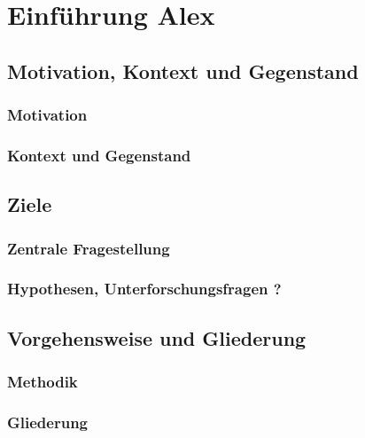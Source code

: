 \documentclass[a4paper, 11pt]{article}
\begin{document}
    \pagestyle{empty}
    
    \newpage
    \hypertarget{contents}{}
    \tableofcontents

    \newpage
    \pagestyle{fancy}
    \section{Einführung \small{Alex}}\label{sec:introduction}
        
		\subsection{Motivation, Kontext und Gegenstand}\label{sec:motivationcontext}
			
			\subsubsection{Motivation}\label{sec:motivation}
				
			\subsubsection{Kontext und Gegenstand}\label{sec:context}
				
		\subsection{Ziele}\label{sec:goals}
			
			\subsubsection{Zentrale Fragestellung}\label{sec:questions}
				
			\subsubsection{Hypothesen, Unterforschungsfragen \small{?}}\label{sec:hypotheses}
				

		\subsection{Vorgehensweise und Gliederung}\label{sec:procedure}
			
			\subsubsection{Methodik}\label{sec:method}
				
			\subsubsection{Gliederung}\label{sec:structure}
				
\end{document}
